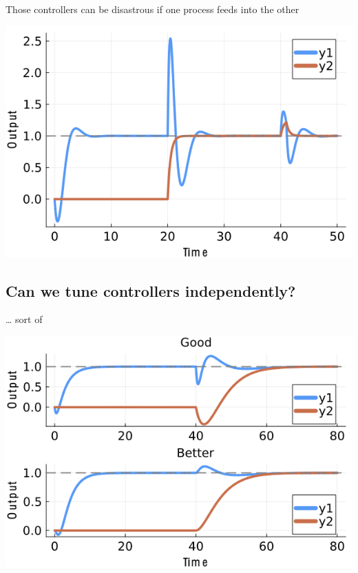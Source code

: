 \documentclass[
  letterpaper,
  DIV=11,
  numbers=noendperiod,
  oneside]{scrartcl}
\begin{document}
Those controllers can be disastrous if one process feeds into the other

\begin{center}
\includegraphics{figs/coupled_loop.png}
\end{center}

\subsection{Can we tune controllers
independently?}\label{can-we-tune-controllers-independently-2}

\ldots{} sort of

\includegraphics{figs/astrom_pid.png}
\end{document}
